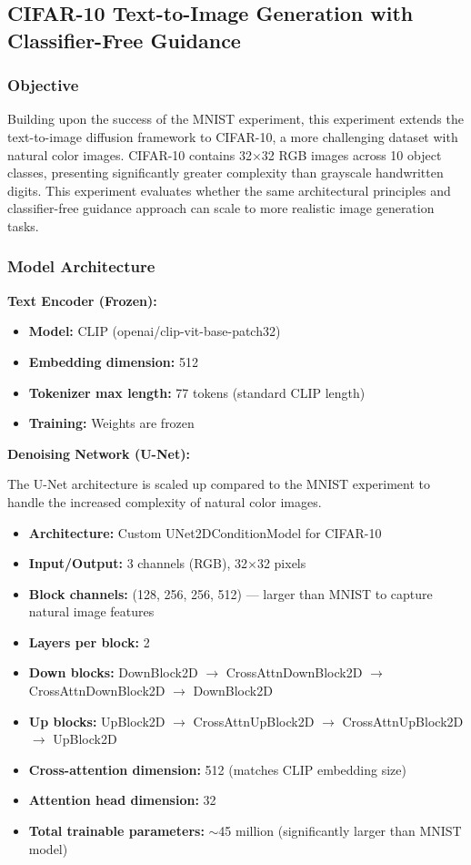 \subsection{CIFAR-10 Text-to-Image Generation with Classifier-Free Guidance}
\label{sec:cifar10}

\subsubsection{Objective}
Building upon the success of the MNIST experiment, this experiment extends the text-to-image diffusion framework to CIFAR-10, a more challenging dataset with natural color images. CIFAR-10 contains 32$\times$32 RGB images across 10 object classes, presenting significantly greater complexity than grayscale handwritten digits. This experiment evaluates whether the same architectural principles and classifier-free guidance approach can scale to more realistic image generation tasks.

\subsubsection{Model Architecture}

\textbf{Text Encoder (Frozen):}
\begin{itemize}
    \item \textbf{Model:} CLIP (openai/clip-vit-base-patch32)
    \item \textbf{Embedding dimension:} 512
    \item \textbf{Tokenizer max length:} 77 tokens (standard CLIP length)
    \item \textbf{Training:} Weights are frozen
\end{itemize}

\textbf{Denoising Network (U-Net):}

The U-Net architecture is scaled up compared to the MNIST experiment to handle the increased complexity of natural color images.

\begin{itemize}
    \item \textbf{Architecture:} Custom UNet2DConditionModel for CIFAR-10
    \item \textbf{Input/Output:} 3 channels (RGB), 32$\times$32 pixels
    \item \textbf{Block channels:} (128, 256, 256, 512) --- larger than MNIST to capture natural image features
    \item \textbf{Layers per block:} 2
    \item \textbf{Down blocks:} DownBlock2D $\rightarrow$ CrossAttnDownBlock2D $\rightarrow$ CrossAttnDownBlock2D $\rightarrow$ DownBlock2D
    \item \textbf{Up blocks:} UpBlock2D $\rightarrow$ CrossAttnUpBlock2D $\rightarrow$ CrossAttnUpBlock2D $\rightarrow$ UpBlock2D
    \item \textbf{Cross-attention dimension:} 512 (matches CLIP embedding size)
    \item \textbf{Attention head dimension:} 32
    \item \textbf{Total trainable parameters:} $\sim$45 million (significantly larger than MNIST model)
\end{itemize}

